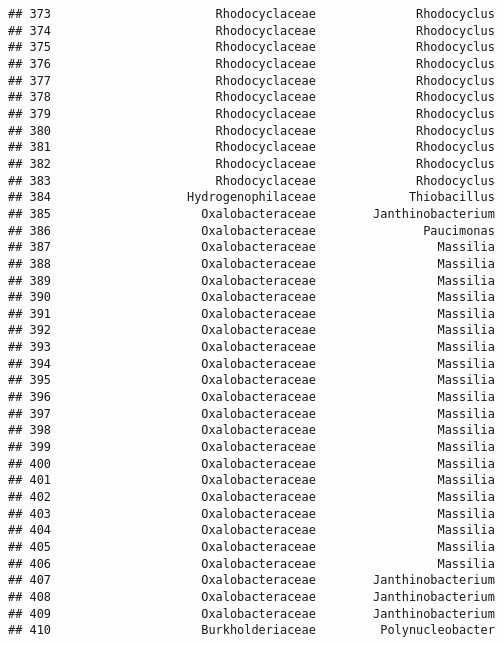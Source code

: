\documentclass[
]{article}
\begin{document}
\begin{verbatim}
## 373                       Rhodocyclaceae              Rhodocyclus
## 374                       Rhodocyclaceae              Rhodocyclus
## 375                       Rhodocyclaceae              Rhodocyclus
## 376                       Rhodocyclaceae              Rhodocyclus
## 377                       Rhodocyclaceae              Rhodocyclus
## 378                       Rhodocyclaceae              Rhodocyclus
## 379                       Rhodocyclaceae              Rhodocyclus
## 380                       Rhodocyclaceae              Rhodocyclus
## 381                       Rhodocyclaceae              Rhodocyclus
## 382                       Rhodocyclaceae              Rhodocyclus
## 383                       Rhodocyclaceae              Rhodocyclus
## 384                   Hydrogenophilaceae             Thiobacillus
## 385                     Oxalobacteraceae        Janthinobacterium
## 386                     Oxalobacteraceae               Paucimonas
## 387                     Oxalobacteraceae                 Massilia
## 388                     Oxalobacteraceae                 Massilia
## 389                     Oxalobacteraceae                 Massilia
## 390                     Oxalobacteraceae                 Massilia
## 391                     Oxalobacteraceae                 Massilia
## 392                     Oxalobacteraceae                 Massilia
## 393                     Oxalobacteraceae                 Massilia
## 394                     Oxalobacteraceae                 Massilia
## 395                     Oxalobacteraceae                 Massilia
## 396                     Oxalobacteraceae                 Massilia
## 397                     Oxalobacteraceae                 Massilia
## 398                     Oxalobacteraceae                 Massilia
## 399                     Oxalobacteraceae                 Massilia
## 400                     Oxalobacteraceae                 Massilia
## 401                     Oxalobacteraceae                 Massilia
## 402                     Oxalobacteraceae                 Massilia
## 403                     Oxalobacteraceae                 Massilia
## 404                     Oxalobacteraceae                 Massilia
## 405                     Oxalobacteraceae                 Massilia
## 406                     Oxalobacteraceae                 Massilia
## 407                     Oxalobacteraceae        Janthinobacterium
## 408                     Oxalobacteraceae        Janthinobacterium
## 409                     Oxalobacteraceae        Janthinobacterium
## 410                     Burkholderiaceae         Polynucleobacter

\end{verbatim}
\end{document}
